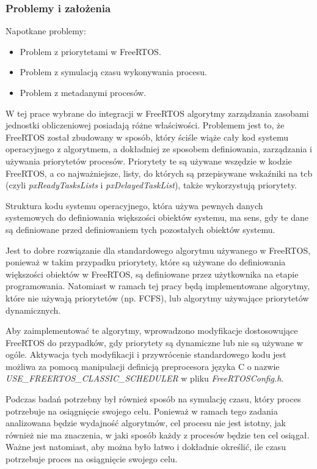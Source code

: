 \documentclass[../../main]{subfiles}
\begin{document}
\subsubsection{Problemy i założenia}

Napotkane problemy:

\begin{itemize}
    \item Problem z priorytetami w FreeRTOS.
    \item Problem z symulacją czasu wykonywania procesu.
    \item Problem z metadanymi procesów.
\end{itemize}

W tej prace wybrane do integracji w FreeRTOS algorytmy zarządzania zasobami jednostki obliczeniowej posiadają różne właściwości. Problemem jest to, że FreeRTOS został zbudowany w sposób, który ściśle wiąże cały kod systemu operacyjnego z algorytmem, a dokładniej ze sposobem definiowania, zarządzania i używania priorytetów procesów. Priorytety te są używane wszędzie w kodzie FreeRTOS, a co najważniejsze, listy, do których są przepisywane wskaźniki na \acrshort{tcb} (czyli \textit{pxReadyTasksLists} i \textit{pxDelayedTaskList}), także wykorzystują priorytety.

Struktura kodu systemu operacyjnego, która używa pewnych danych systemowych do definiowania większości obiektów systemu, ma sens, gdy te dane są definiowane przed definiowaniem tych pozostałych obiektów systemu.

Jest to dobre rozwiązanie dla standardowego algorytmu używanego w FreeRTOS, ponieważ w takim przypadku priorytety, które są używane do definiowania większości obiektów w FreeRTOS, są definiowane przez użytkownika na etapie programowania. Natomiast w ramach tej pracy będą implementowane algorytmy, które nie używają priorytetów (np. FCFS), lub algorytmy używające priorytetów dynamicznych.

Aby zaimplementować te algorytmy, wprowadzono modyfikacje dostosowujące FreeRTOS do przypadków, gdy priorytety są dynamiczne lub nie są używane w ogóle. Aktywacja tych modyfikacji i przywrócenie standardowego kodu jest możliwa za pomocą manipulacji definicją preprocesora języka C o nazwie \textit{USE\_FREERTOS\_CLASSIC\_SCHEDULER} w pliku \textit{FreeRTOSConfig.h}.

Podczas badań potrzebny był również sposób na symulację czasu, który proces potrzebuje na osiągnięcie swojego celu. Ponieważ w ramach tego zadania analizowana będzie wydajność algorytmów, cel procesu nie jest istotny, jak również nie ma znaczenia, w jaki sposób każdy z procesów będzie ten cel osiągał. Ważne jest natomiast, aby można było łatwo i dokładnie określić, ile czasu potrzebuje proces na osiągnięcie swojego celu.
\end{document}
